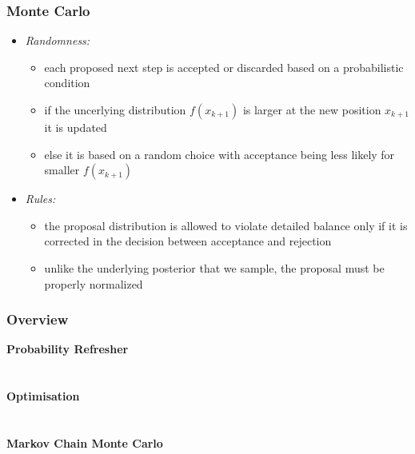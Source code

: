 	\begin{frame}
		\frametitle{Monte Carlo}
		\begin{itemize}
			\item<2-> \itshape{Randomness:}
			\begin{itemize}
				\item<3-> each proposed next step is accepted or discarded based on a probabilistic condition
				\item<4-> if the uncerlying distribution $f(x_{k+1})$ is larger at the new position $x_{k+1}$ it is updated
				\item<5-> else it is based on a random choice with acceptance being less likely for smaller $f(x_{k+1})$
			\end{itemize}
			\item<6-> \itshape{Rules:}
			\begin{itemize}
				\item<7-> the proposal distribution is allowed to violate detailed balance only if it is corrected in the
						  decision between acceptance and rejection
				\item<8-> unlike the underlying posterior that we sample, the proposal must be properly normalized
			\end{itemize}
		\end{itemize}
	\end{frame}

	\begin{frame}
		\frametitle{Overview}
		\bfseries{Probability Refresher}\\[1.5pt]
		\hspace*{3ex}\\
		\hspace*{3ex}\\[3.0pt]
		\bfseries{Optimisation}\\[1.5pt]
		\hspace*{3ex}\\
		\hspace*{3ex}\\[3.0pt]
		\bfseries{Markov Chain Monte Carlo}\\[1.5pt]
		\hspace*{3ex}\\
		\hspace*{3ex}\\
		\hspace*{3ex}\\[3.0pt]
	\end{frame}


